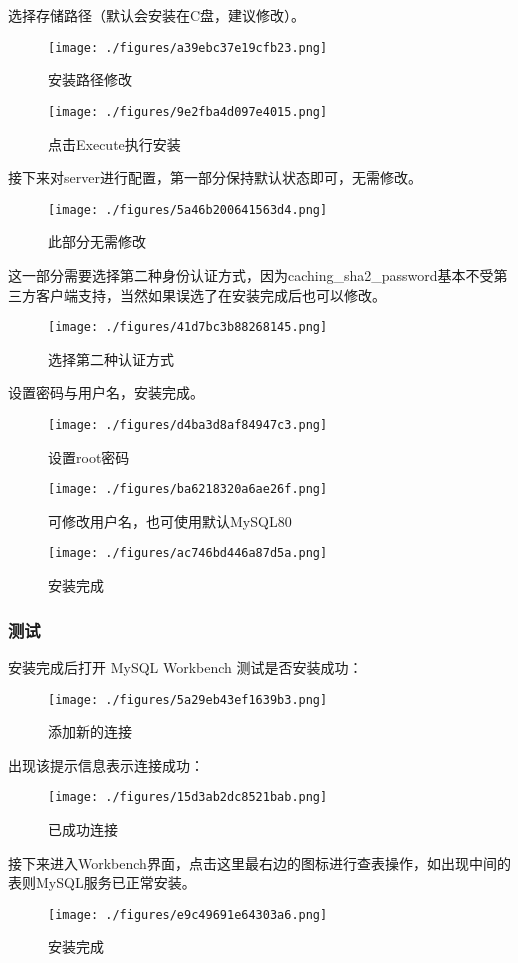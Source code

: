 选择存储路径（默认会安装在C盘，建议修改）。
\begin{figure}[ht]
\centering
\texttt{[image: ./figures/a39ebc37e19cfb23.png]}
\caption{安装路径修改} \label{fig_MSQ001_10}
\end{figure}

\begin{figure}[ht]
\centering
\texttt{[image: ./figures/9e2fba4d097e4015.png]}
\caption{点击Execute执行安装} \label{fig_MSQ001_11}
\end{figure}

接下来对server进行配置，第一部分保持默认状态即可，无需修改。
\begin{figure}[ht]
\centering
\texttt{[image: ./figures/5a46b200641563d4.png]}
\caption{此部分无需修改} \label{fig_MSQ001_12}
\end{figure}

这一部分需要选择第二种身份认证方式，因为caching_sha2_password基本不受第三方客户端支持，当然如果误选了在安装完成后也可以修改。

\begin{figure}[ht]
\centering
\texttt{[image: ./figures/41d7bc3b88268145.png]}
\caption{选择第二种认证方式} \label{fig_MSQ001_13}
\end{figure}

设置密码与用户名，安装完成。
\begin{figure}[ht]
\centering
\texttt{[image: ./figures/d4ba3d8af84947c3.png]}
\caption{设置root密码} \label{fig_MSQ001_14}
\end{figure}

\begin{figure}[ht]
\centering
\texttt{[image: ./figures/ba6218320a6ae26f.png]}
\caption{可修改用户名，也可使用默认MySQL80} \label{fig_MSQ001_15}
\end{figure}

\begin{figure}[ht]
\centering
\texttt{[image: ./figures/ac746bd446a87d5a.png]}
\caption{安装完成} \label{fig_MSQ001_16}
\end{figure}

\subsubsection{测试}
安装完成后打开 MySQL Workbench 测试是否安装成功：
\begin{figure}[ht]
\centering
\texttt{[image: ./figures/5a29eb43ef1639b3.png]}
\caption{添加新的连接} \label{fig_MSQ001_17}
\end{figure}

出现该提示信息表示连接成功：
\begin{figure}[ht]
\centering
\texttt{[image: ./figures/15d3ab2dc8521bab.png]}
\caption{已成功连接} \label{fig_MSQ001_18}
\end{figure}

接下来进入Workbench界面，点击这里最右边的图标进行查表操作，如出现中间的表则MySQL服务已正常安装。
\begin{figure}[ht]
\centering
\texttt{[image: ./figures/e9c49691e64303a6.png]}
\caption{安装完成} \label{fig_MSQ001_19}
\end{figure}